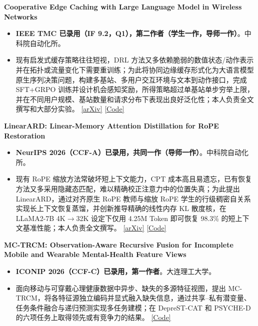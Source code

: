 \documentclass[a4paper,10pt]{ctexart}
\begin{document}
\noindent\textbf{Cooperative Edge Caching with Large Language Model in Wireless Networks}
\begin{itemize}[leftmargin=1.15em, itemsep=0.02em, topsep=0.03em, parsep=0pt]
    \item \textbf{IEEE TMC 已录用（IF 9.2，Q1），第二作者（学生一作，导师一作）}。中科院自动化所。
    \item 现有启发式缓存策略往往短视，DRL 方法又多依赖脆弱的数值状态/动作表示并在拓扑或流量变化下需要重训练；为此将协同边缘缓存形式化为大语言模型原生序列决策问题，构建多基站、多用户交互环境与文本到动作接口，完成 SFT+GRPO 训练并设计机会感知奖励，所得策略超过单基站单步穷举上限，并在不同用户规模、基站数量和请求分布下表现出良好泛化性；本人负责全文撰写和大部分实验。 \href{https://arxiv.org/abs/2602.13307}{[arXiv]} \href{https://github.com/gracefulning/CoopLLM-Cache}{[Code]}
\end{itemize}
\vspace{0.03em}

\noindent\textbf{LinearARD: Linear-Memory Attention Distillation for RoPE Restoration}
\begin{itemize}[leftmargin=1.15em, itemsep=0.02em, topsep=0.03em, parsep=0pt]
    \item \textbf{NeurIPS 2026（CCF-A）已录用，共同一作（导师一作）}。中科院自动化所。
    \item 现有 RoPE 缩放方法常破坏短上下文能力，CPT 成本高且易遗忘，已有恢复方法又多采用隐藏态匹配，难以精确校正注意力中的位置失真；为此提出 LinearARD，通过对齐原生 RoPE 教师与缩放 RoPE 学生的行级稠密自关系实现长上下文恢复蒸馏，并创新推导精确的线性内存 KL 散度核，在 LLaMA2-7B 4K$\to$32K 设定下仅用 4.25M Token 即可恢复 98.3\% 的短上下文基准性能；本人负责全文撰写。 \href{https://arxiv.org/abs/2604.00004}{[arXiv]} \href{https://github.com/gracefulning/LinearARD}{[Code]}
\end{itemize}
\vspace{0.03em}

\noindent\textbf{MC-TRCM: Observation-Aware Recursive Fusion for Incomplete Mobile and Wearable Mental-Health Feature Views}
\begin{itemize}[leftmargin=1.15em, itemsep=0.02em, topsep=0.03em, parsep=0pt]
    \item \textbf{ICONIP 2026（CCF-C）已录用，第一作者}。大连理工大学。
    \item 面向移动与可穿戴心理健康数据中异步、缺失的多源特征视图，提出 MC-TRCM，将各特征源独立编码并显式融入缺失信息，通过共享--私有潜变量、任务条件融合与递归预测实现多任务建模；在 DepreST-CAT 和 PSYCHE-D 的六项任务上取得领先或有竞争力的结果。 \href{https://github.com/Botwwt/MC-TRCM}{[Code]}
\end{itemize}
\vspace{0.03em}
\end{document}
